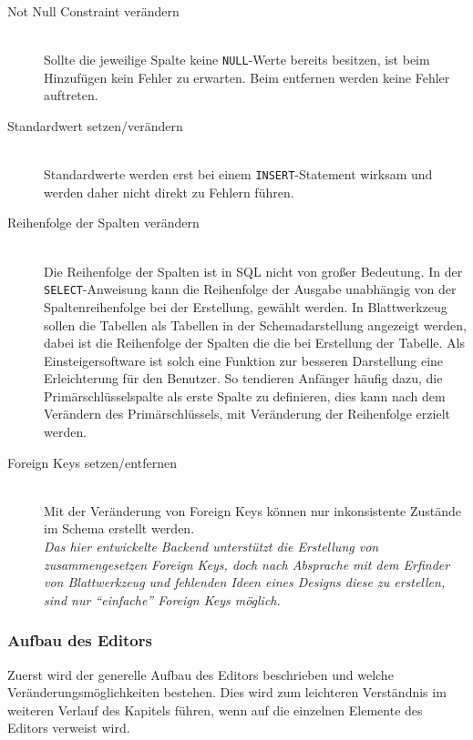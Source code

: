 \begin{description}
\item[Not Null Constraint verändern] \hfill\\
Sollte die jeweilige Spalte keine \texttt{NULL}-Werte bereits besitzen, ist beim Hinzufügen kein Fehler zu erwarten.
Beim entfernen werden keine Fehler auftreten.

\item[Standardwert setzen/verändern] \hfill\\
Standardwerte werden erst bei einem \texttt{INSERT}-Statement wirksam und werden daher nicht direkt zu Fehlern führen.

\item[Reihenfolge der Spalten verändern] \hfill\\
Die Reihenfolge der Spalten ist in SQL nicht von großer Bedeutung.
In der \texttt{SELECT}-Anweisung kann die Reihenfolge der Ausgabe unabhängig von der Spaltenreihenfolge bei der Erstellung, gewählt werden.
In Blattwerkzeug sollen die Tabellen als Tabellen in der Schemadarstellung angezeigt werden, dabei ist die Reihenfolge der Spalten die die bei Erstellung der Tabelle. Als Einsteigersoftware ist solch eine Funktion zur besseren Darstellung eine Erleichterung für den Benutzer. So tendieren Anfänger häufig dazu, die Primärschlüsselspalte als erste Spalte zu definieren, dies kann nach dem Verändern des Primärschlüssels, mit Veränderung der Reihenfolge erzielt werden.

\item[Foreign Keys setzen/entfernen] \hfill\\
Mit der Veränderung von Foreign Keys können nur inkonsistente Zustände im Schema erstellt werden.\\
\textit{Das hier entwickelte Backend unterstützt die Erstellung von zusammengesetzen Foreign Keys, doch nach Absprache mit dem Erfinder von Blattwerkzeug und fehlenden Ideen eines Designs diese zu erstellen, sind nur ``einfache'' Foreign Keys möglich.}
\label{fk_disclaimer}  
\end{description}


\subsubsection{Aufbau des Editors}
\label{subsubsec04:editor_aufbau}

Zuerst wird der generelle Aufbau des Editors beschrieben und welche Veränderungsmöglichkeiten bestehen. Dies wird zum leichteren Verständnis im weiteren Verlauf des Kapitels führen, wenn auf die einzelnen Elemente des Editors verweist wird. 

